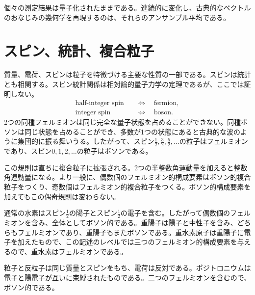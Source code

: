 個々の測定結果は量子化されたままである。連続的に変化し、古典的なベクトルのおなじみの幾何学を再現するのは、それらのアンサンブル平均である。

\section{スピン、統計、複合粒子}

質量、電荷、スピンは粒子を特徴づける主要な性質の一部である。スピンは統計とも相関する。スピン統計関係は相対論的量子力学の定理であるが、ここでは証明しない。
\begin{equation}
\begin{aligned}
\text{half-integer spin} &\quad\Longleftrightarrow\quad \text{fermion},\\
\text{integer spin} &\quad\Longleftrightarrow\quad \text{boson}.
\end{aligned}
\end{equation}
2つの同種フェルミオンは同じ完全な量子状態を占めることができない。同種ボソンは同じ状態を占めることができ、多数が1つの状態にあると古典的な波のように集団的に振る舞いうる。したがって、スピン\(\tfrac12,\tfrac32,\tfrac52,\ldots\)の粒子はフェルミオンであり、スピン\(0,1,2,\ldots\)の粒子はボソンである。

この規則は直ちに複合粒子に拡張される。2つの半整数角運動量を加えると整数角運動量になる。より一般に、偶数個のフェルミオン的構成要素はボソン的複合粒子をつくり、奇数個はフェルミオン的複合粒子をつくる。ボソン的構成要素を加えてもこの偶奇規則は変わらない。

通常の水素はスピン\(\tfrac12\)の陽子とスピン\(\tfrac12\)の電子を含む。したがって偶数個のフェルミオンを含み、全体としてボソン的である。重陽子は陽子と中性子を含み、どちらもフェルミオンであり、重陽子もまたボソンである。重水素原子は重陽子に電子を加えたもので、この記述のレベルでは三つのフェルミオン的構成要素を与えるので、重水素はフェルミオンである。

粒子と反粒子は同じ質量とスピンをもち、電荷は反対である。ポジトロニウムは電子と陽電子が互いに束縛されたものである。二つのフェルミオンを含むので、ボソン的である。

\begin{classroomqa}
\end{classroomqa}

